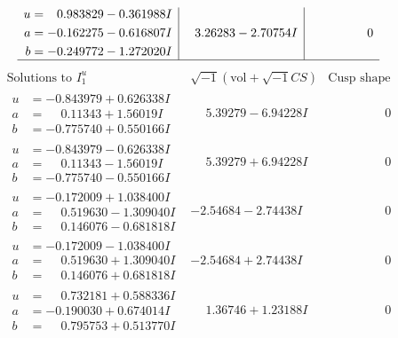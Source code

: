 \documentclass[1p]{elsarticle_modified}
\theoremstyle{definition}
\newcommand{\I}{\sqrt{-1}}
\begin{document}
$$\begin{array}{c|c|c}
\begin{aligned}
u &= \phantom{-}0.983829 - 0.361988 I \\
a &= -0.162275 - 0.616807 I \\
b &= -0.249772 - 1.272020 I\end{aligned}
 & \phantom{-}3.26283 - 2.70754 I & \phantom{-0.000000 } 0\\
 \hline 
 \end{array}$$\newpage$$\begin{array}{c|c|c}  
\text{Solutions to }I^u_{1}& \I (\text{vol} + \sqrt{-1}CS) & \text{Cusp shape}\\
 \hline 
\begin{aligned}
u &= -0.843979 + 0.626338 I \\
a &= \phantom{-}0.11343 + 1.56019 I \\
b &= -0.775740 + 0.550166 I\end{aligned}
 & \phantom{-}5.39279 - 6.94228 I & \phantom{-0.000000 } 0 \\ \hline\begin{aligned}
u &= -0.843979 - 0.626338 I \\
a &= \phantom{-}0.11343 - 1.56019 I \\
b &= -0.775740 - 0.550166 I\end{aligned}
 & \phantom{-}5.39279 + 6.94228 I & \phantom{-0.000000 } 0 \\ \hline\begin{aligned}
u &= -0.172009 + 1.038400 I \\
a &= \phantom{-}0.519630 - 1.309040 I \\
b &= \phantom{-}0.146076 - 0.681818 I\end{aligned}
 & -2.54684 - 2.74438 I & \phantom{-0.000000 } 0 \\ \hline\begin{aligned}
u &= -0.172009 - 1.038400 I \\
a &= \phantom{-}0.519630 + 1.309040 I \\
b &= \phantom{-}0.146076 + 0.681818 I\end{aligned}
 & -2.54684 + 2.74438 I & \phantom{-0.000000 } 0 \\ \hline\begin{aligned}
u &= \phantom{-}0.732181 + 0.588336 I \\
a &= -0.190030 + 0.674014 I \\
b &= \phantom{-}0.795753 + 0.513770 I\end{aligned}
 & \phantom{-}1.36746 + 1.23188 I & \phantom{-0.000000 } 0 \\ \hline\begin{aligned}

\end{aligned}
\end{array}$$
\end{document}

